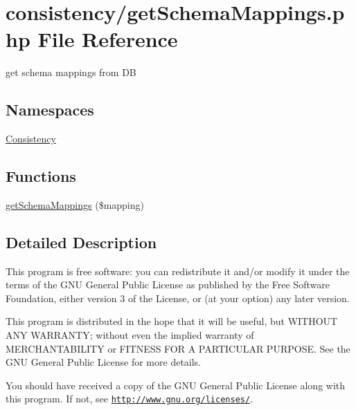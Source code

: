 \hypertarget{get_schema_mappings_8php}{}\section{consistency/get\+Schema\+Mappings.php File Reference}
\label{get_schema_mappings_8php}


get schema mappings from DB  


\subsection*{Namespaces}
\begin{DoxyCompactItemize}
\item 
 \hyperlink{namespace_consistency}{Consistency}
\end{DoxyCompactItemize}
\subsection*{Functions}
\begin{DoxyCompactItemize}
\item 
\hyperlink{namespace_consistency_aa98f8a888d842fcaefeca3407c10435c}{get\+Schema\+Mappings} (\$mapping)
\end{DoxyCompactItemize}


\subsection{Detailed Description}
This program is free software\+: you can redistribute it and/or modify it under the terms of the G\+NU General Public License as published by the Free Software Foundation, either version 3 of the License, or (at your option) any later version.

This program is distributed in the hope that it will be useful, but W\+I\+T\+H\+O\+UT A\+NY W\+A\+R\+R\+A\+N\+TY; without even the implied warranty of M\+E\+R\+C\+H\+A\+N\+T\+A\+B\+I\+L\+I\+TY or F\+I\+T\+N\+E\+SS F\+OR A P\+A\+R\+T\+I\+C\+U\+L\+AR P\+U\+R\+P\+O\+SE. See the G\+NU General Public License for more details.

You should have received a copy of the G\+NU General Public License along with this program. If not, see \href{http://www.gnu.org/licenses/}{\tt http\+://www.\+gnu.\+org/licenses/}. 